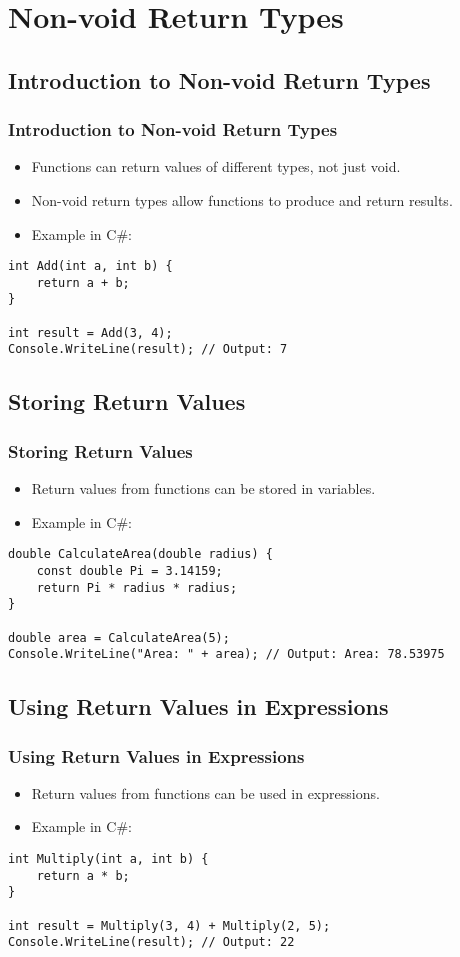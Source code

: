 \section{Non-void Return Types}

\subsection{Introduction to Non-void Return Types}
\begin{frame}[fragile]
\frametitle{Introduction to Non-void Return Types}
\begin{itemize}
    \item Functions can return values of different types, not just void.
    \item Non-void return types allow functions to produce and return results.
    \item Example in C\#:
\end{itemize}
\begin{lstlisting}
int Add(int a, int b) {
    return a + b;
}

int result = Add(3, 4);
Console.WriteLine(result); // Output: 7
\end{lstlisting}
\end{frame}

\subsection{Storing Return Values}
\begin{frame}[fragile]
\frametitle{Storing Return Values}
\begin{itemize}
    \item Return values from functions can be stored in variables.
    \item Example in C\#:
\end{itemize}
\begin{lstlisting}
double CalculateArea(double radius) {
    const double Pi = 3.14159;
    return Pi * radius * radius;
}

double area = CalculateArea(5);
Console.WriteLine("Area: " + area); // Output: Area: 78.53975
\end{lstlisting}
\end{frame}

\subsection{Using Return Values in Expressions}
\begin{frame}[fragile]
\frametitle{Using Return Values in Expressions}
\begin{itemize}
    \item Return values from functions can be used in expressions.
    \item Example in C\#:
\end{itemize}
\begin{lstlisting}
int Multiply(int a, int b) {
    return a * b;
}

int result = Multiply(3, 4) + Multiply(2, 5);
Console.WriteLine(result); // Output: 22
\end{lstlisting}
\end{frame}

